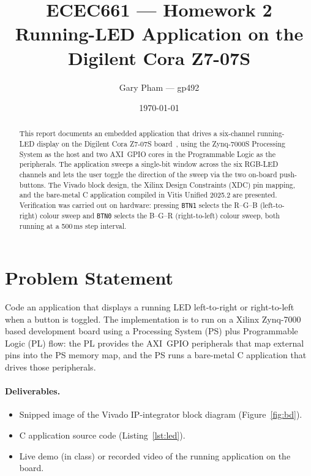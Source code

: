 \documentclass[12pt]{article}
\title{ECEC661 --- Homework 2\\
       \large Running-LED Application on the Digilent Cora Z7-07S}
\author{Gary Pham --- gp492}
\date{\today}
\begin{document}
\maketitle
\thispagestyle{fancy}

\begin{abstract}
This report documents an embedded application that drives a six-channel
running-LED display on the Digilent Cora Z7-07S
board~\cite{coraz7rm}, using the Zynq-7000S Processing System as the
host and two AXI~GPIO cores in the Programmable Logic as the
peripherals. The application sweeps a single-bit window across the six
RGB-LED channels and lets the user toggle the direction of the sweep
via the two on-board push-buttons. The Vivado block design, the Xilinx
Design Constraints (XDC) pin mapping, and the bare-metal C application
compiled in Vitis Unified 2025.2 are presented. Verification was
carried out on hardware: pressing \texttt{BTN1} selects the R--G--B
(left-to-right) colour sweep and \texttt{BTN0} selects the B--G--R
(right-to-left) colour sweep, both running at a 500\,ms step interval.
\end{abstract}

\section{Problem Statement}
\label{sec:problem}

Code an application that displays a running LED left-to-right or
right-to-left when a button is toggled. The implementation is to run on
a Xilinx Zynq-7000 based development board using a Processing System
(PS) plus Programmable Logic (PL) flow: the PL provides the AXI~GPIO
peripherals that map external pins into the PS memory map, and the PS
runs a bare-metal C application that drives those peripherals.

\paragraph{Deliverables.}
\begin{itemize}[nosep]
  \item Snipped image of the Vivado IP-integrator block diagram
        (Figure~\ref{fig:bd}).
  \item C application source code
        (Listing~\ref{lst:led}).
  \item Live demo (in class) or recorded video of the running
        application on the board.
\end{itemize}
\end{document}
